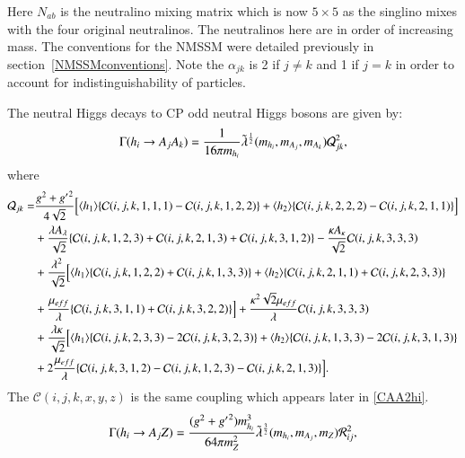 \documentclass[final,3p,times]{elsarticle}
\begin{document}
Here $N_{ab}$ is the neutralino mixing matrix which is now $5\times5$ as the singlino mixes with the four original neutralinos. The neutralinos here are in order of increasing mass. The conventions for the NMSSM were detailed previously in section~\ref{NMSSMconventions}. Note the $\alpha_{jk}$ is 2 if $j\neq k$ and 1 if $j=k$ in order to account for indistinguishability of particles.

The neutral Higgs decays to CP odd neutral Higgs bosons are given by:
\begin{equation} \label{hAANMSSM}
\Gamma(h_{i} \rightarrow A_{j} A_{k}) = {1 \over 16 \pi m_{h_i}} \tilde{\lambda}^{1 \over 2}(m_{h_i},m_{A_j},m_{A_k}) \mathcal{Q}_{jk}^2,
\end{equation}
where 
\begin{equation}
\begin{aligned}
\mathcal{Q}_{jk} = & {g^2 + {g'}^2 \over 4\sqrt{2}}\Big[\langle h_{1} \rangle \{ \mathcal{C}(i,j,k,1,1,1) - \mathcal{C}(i,j,k,1,2,2) \} + \langle h_{2} \rangle \{ \mathcal{C}(i,j,k,2,2,2) - \mathcal{C} (i,j,k,2,1,1)\}\Big] \\ & + {\lambda A_{\lambda} \over \sqrt{2}}\{ \mathcal{C}(i,j,k,1,2,3) +\mathcal{C}(i,j,k,2,1,3) + \mathcal{C}(i,j,k,3,1,2)\} - {\kappa A_{\kappa} \over \sqrt{2}}\mathcal{C}(i,j,k,3,3,3) \\ & + {\lambda^2 \over \sqrt{2}}\Big[\langle h_{1} \rangle \{\mathcal{C}(i,j,k,1,2,2) + \mathcal{C}(i,j,k,1,3,3)\} + \langle h_{2} \rangle \{ \mathcal{C}(i,j,k,2,1,1) + \mathcal{C}(i,j,k,2,3,3)\} \\ & + {\mu_{eff} \over \lambda}\{\mathcal{C}(i,j,k,3,1,1) + \mathcal{C}(i,j,k,3,2,2)\}\Big] + {\kappa^2 \sqrt{2} \mu_{eff} \over \lambda} \mathcal{C}(i,j,k,3,3,3) \\ & + {\lambda \kappa \over \sqrt{2}}\Big[\langle h_{1} \rangle \{\mathcal{C}(i,j,k,2,3,3) - 2\mathcal{C}(i,j,k,3,2,3)\} + \langle h_{2} \rangle \{\mathcal{C}(i,j,k,1,3,3) - 2\mathcal{C}(i,j,k,3,1,3)\} \\ & + 2 {\mu_{eff} \over \lambda}\{\mathcal{C}(i,j,k,3,1,2) - \mathcal{C}(i,j,k,1,2,3) - \mathcal{C}(i,j,k,2,1,3)\}\Big].
\end{aligned}
\end{equation}
The $\mathcal{C}(i,j,k,x,y,z)$ is the same coupling which appears later in \eqref{CAA2hi}.
\begin{equation} \label{hAZNMSSM}
\Gamma(h_i \rightarrow A_j Z) = {(g^2 + {g'}^2) m_{h_i}^3 \over 64\pi m_{Z}^2}\tilde{\lambda}^{3 \over 2}(m_{h_i},m_{A_j},m_Z) \mathcal{R}_{ij}^2,
\end{equation}
\end{document}
